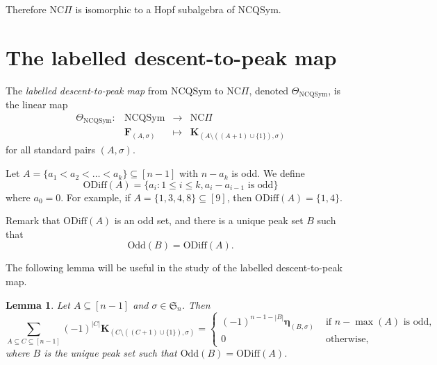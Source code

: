 \documentclass[11pt]{amsart}
\newtheorem{Lemma}[Theorem]{Lemma}
\newtheorem{Proposition}[Theorem]{Proposition}
\newtheorem{Definition}[Theorem]{Definition}
\numberwithin{equation}{section}
\newcommand{\NCQSym}{\mathrm{NCQSym}}
\newcommand{\odd}{\mathrm{Odd}}
\newcommand{\oddd}{\mathrm{ODiff}}
\newcommand{\NCPeak}{\mathrm{NC}\Pi}
\newcommand{\boldeta}{{\boldsymbol{\eta}}}
\begin{document}
Therefore $\NCPeak$ is isomorphic to a Hopf subalgebra of $\NCQSym$. 



\section{The labelled descent-to-peak map}\label{sec:thetamap-n}



	The \emph{labelled descent-to-peak map} from $\NCQSym$ to $\NCPeak$, denoted $\Theta_{\NCQSym}$, is the linear map
	\begin{equation}\label{def:theta-non}
	\begin{array}{cccc}
		\Theta_\NCQSym: & \NCQSym & \to & \NCPeak\\
		& \mathbf{F}_{(A,\sigma)} & \mapsto & \mathbf{K}_{(A\setminus((A+1)\cup\{1\}),\sigma)}
	\end{array}
	\end{equation}
	for all standard pairs $(A,\sigma)$.







Let $A=\{a_1<a_2<\dots<a_k\}\subseteq[n-1]$ with $n-a_k$ is odd. We define $$\oddd(A)=\{a_i:1\leq i\leq k, a_i-a_{i-1} \text{ is odd}\}$$ where $a_0=0$. For example, if $A=\{1,3,4,8\}\subseteq[9]$, then $\oddd(A)=\{1,4\}$. 

Remark that $\oddd(A)$ is an odd set, and there is a unique peak set $B$ such that $$\odd(B)=\oddd(A).$$


The following lemma will be useful in the study of the labelled descent-to-peak map.
\begin{Lemma}\label{lem:M}
	Let $A\subseteq[n-1]$ and $\sigma\in\mathfrak{S}_n$. Then
	$$\sum_{A\subseteq C\subseteq[n-1]}(-1)^{|C|}\mathbf{K}_{(C\setminus((C+1)\cup\{1\}),\sigma)}=\begin{cases}
		(-1)^{n-1-|B|}\boldeta_{(B,\sigma)} & \text{ if }n-\max (A)\text{ is odd,}\\
		0 & \text{ otherwise,}
	\end{cases}$$
	where $B$ is the unique peak set such that $\odd(B)=\oddd(A)$.
	
	\end{Lemma}
\end{document}
